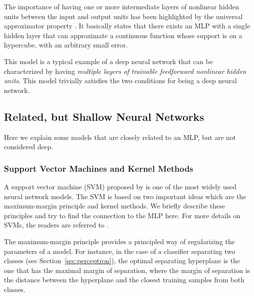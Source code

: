 \documentclass[dissertation,nocontribution,draft*]{aaltoseries}
\begin{document}
The importance of having one or more intermediate layers of
nonlinear hidden units between the input and output units
has been highlighted by the universal approximator property
\citep{Cybenko1989,Hornik1989}. It basically states that
there exists an MLP with a single hidden layer that can
approximate a continuous function whose support is on a
hypercube, with an arbitrary small error.


This model is a typical example of a deep neural network
that can be characterized by having \textit{multiple layers
of trainable feedforward nonlinear hidden units}. This
model trivially satisfies the two conditions for being a
deep neural network.

\subsection{Related, but Shallow Neural Networks}

Here we explain some models that are closely related to an
MLP, but are not considered deep.

\subsubsection{Support Vector Machines and Kernel Methods}
\label{sec:svm}

A support vector machine (SVM) proposed by
\citet{Cortes1995} is one of the most widely used neural
network models. The SVM is based on two important ideas
which are the maximum-margin principle and kernel methods.
We briefly describe these principles and try to find the
connection to the MLP here.  For more details on SVMs, the
readers are referred to \citep{Scholkopf2001}.

The maximum-margin principle provides a principled way of
regularizing the parameters of a model. For instance, in the
case of a classifier separating two classes (see
Section~\ref{sec:perceptron}), the optimal separating
hyperplane is the one that has the maximal margin of separation,
where the margin of separation is the distance between the
hyperplane and the closest training samples from both
classes.
\end{document}
